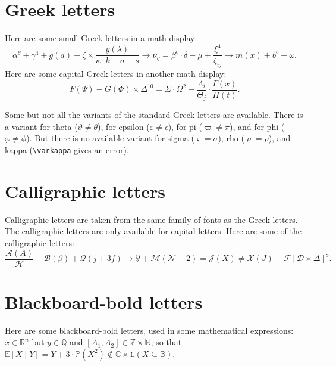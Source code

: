 \section{Greek letters}

Here are some small Greek letters in a math display: 
\begin{equation*}
\alpha^{\theta} + \gamma^4 + g(a) - \zeta \times \frac{y(\lambda)}{\kappa \cdot k+ \sigma - s} \to \nu_{\eta} = \beta^\epsilon \cdot \delta - \mu + \frac{\xi^4}{\zeta_{ij}} \to m(x) + b^e + \omega .
\end{equation*}
Here are some capital Greek letters in another math display: 
\begin{equation}
F(\Psi) - G(\Phi) \times \Delta^{10} = \Sigma \cdot \Omega^2 - \frac{\Lambda_i}{\Theta_j} \cdot \frac{\Gamma(x)}{\Pi(t)}.
\label{e:capitalgreek}\end{equation}

Some but not all the variants of the standard Greek letters are available. There is a variant for theta ($\vartheta \neq \theta$), for epsilon ($\varepsilon \neq \epsilon$), for pi ($\varpi \neq \pi$), and for phi ($\varphi \neq \phi$). But there is no available variant for sigma ($\varsigma = \sigma$), rho ($\varrho = \rho$), and kappa (\texttt{\textbackslash varkappa} gives an error).

\section{Calligraphic letters} 

Calligraphic letters are taken from the same family of fonts as the Greek letters. The calligraphic letters are only available for capital letters. Here are some of the calligraphic letters: 
\begin{equation}
\frac{\mathcal{A}(A)}{\mathcal{H}} - \mathcal{B}(\beta) + \mathcal{Q}(j+3f) \to \mathcal{Y} + \mathcal{M}(\mathcal{N} - 2) = \mathcal{J}(X) \neq \mathcal{X}(J) - \mathcal{F}[\mathcal{D} \times \Delta]^8. 
\label{e:calligraphic}\end{equation}

\section{Blackboard-bold letters} 

Here are some blackboard-bold letters, used in some mathematical expressions: $x \in\mathbb{R}^n$ but $y\in \mathbb{Q}$ and $[A_1,A_2] \in \mathbb{Z} \times \mathbb{N}$; so that $\mathbb{E}[X\mid Y] = Y + 3 \cdot \mathbb{P}(X^2) \notin \mathbb{C} \times \mathbb{1}(X \subseteq \mathbb{B})$.


